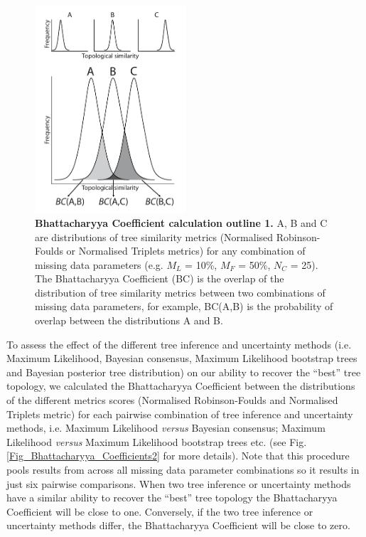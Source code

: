 \begin{figure}[!ht]
\centering
    \includegraphics[width=0.5\textwidth]{TEM/Figures/Fig2.pdf}
\caption[Bhattacharyya Coefficient calculation outline 1]{\textbf{Bhattacharyya Coefficient calculation outline 1.} A, B and C are distributions of tree similarity metrics (Normalised Robinson-Foulds or Normalised Triplets metrics) for any combination of missing data parameters (e.g. $M_{L}$ = 10\%, $M_{F}$ = 50\%, $N_{C}$ = 25). The Bhattacharyya Coefficient (BC) is the overlap of the distribution of tree similarity metrics between two combinations of missing data parameters, for example, BC(A,B) is the probability of overlap between the distributions A and B.}
\label{Fig_Bhattacharyya_Coefficients1}
\end{figure}

To assess the effect of the different tree inference and uncertainty methods (i.e. Maximum Likelihood, Bayesian consensus, Maximum Likelihood bootstrap trees and Bayesian posterior tree distribution) on our ability to recover the ``best'' tree topology, we calculated the Bhattacharyya Coefficient between the distributions of the different metrics scores (Normalised Robinson-Foulds and Normalised Triplets metric) for each pairwise combination of tree inference and uncertainty methods, i.e. Maximum Likelihood \textit{versus} Bayesian consensus; Maximum Likelihood \textit{versus} Maximum Likelihood bootstrap trees etc. (see Fig. \ref{Fig_Bhattacharyya_Coefficients2} for more details).
Note that this procedure pools results from across all missing data parameter combinations so it results in just six pairwise comparisons.
When two tree inference or uncertainty methods have a similar ability to recover the ``best'' tree topology the Bhattacharyya Coefficient will be close to one.
Conversely, if the two tree inference or uncertainty methods differ, the Bhattacharyya Coefficient will be close to zero.

